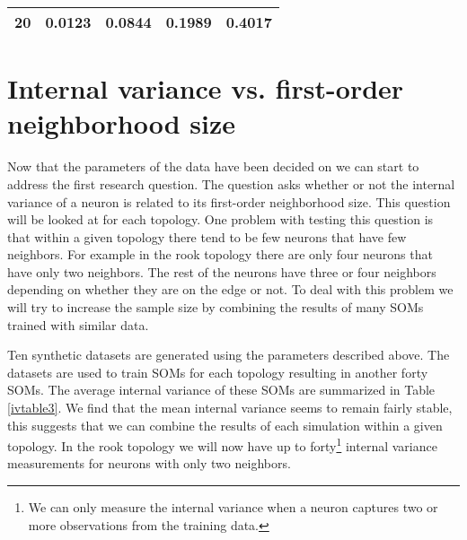 \begin{table}
{\begin{tabular}{|c||c|c|c|c|}
  \hline
  \textbf{20} & 0.0123& 0.0844& 0.1989& 0.4017 \\
  \hline
  \end{tabular} 
  \label{ivtable1:graph}
} 
\end{table}

\section{Internal variance vs. first-order neighborhood size}
Now that the parameters of the data have been decided on we can start to
address the first research question. The question asks whether or not the
internal variance of a neuron is related to its first-order neighborhood size.
This question will be looked at for each topology.  One problem with testing
this question is that within a given topology there tend to be few neurons
that have few neighbors.  For example in the rook topology there are only four
neurons that have only two neighbors. The rest of the neurons have three or
four neighbors depending on whether they are on the edge or not. To deal with
this problem we will try to increase the sample size by combining the results
of many SOMs trained with similar data.

Ten synthetic datasets are generated using the parameters described above. The
datasets are used to train SOMs for each topology resulting in another forty
SOMs. The average internal variance of these SOMs are summarized in Table
\ref{ivtable3}.  We find that the mean internal variance seems to remain
fairly stable, this suggests that we can combine the results of each
simulation within a given topology. In the rook topology we will now have up
to forty\footnote{We can only measure the internal variance when a neuron
captures two or more observations from the training data.} internal variance
measurements for neurons with only two neighbors.

